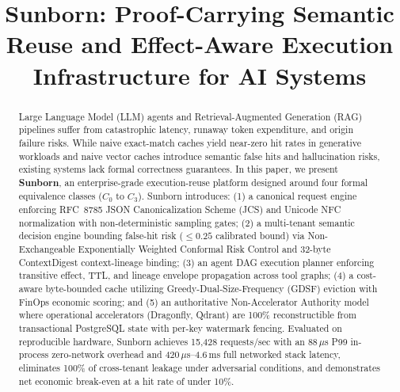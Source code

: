 \documentclass[conference]{IEEEtran}
\begin{document}
\title{Sunborn: Proof-Carrying Semantic Reuse and Effect-Aware Execution Infrastructure for AI Systems}

\author{
}

\maketitle

\begin{abstract}
Large Language Model (LLM) agents and Retrieval-Augmented Generation (RAG) pipelines suffer from catastrophic latency, runaway token expenditure, and origin failure risks. While naive exact-match caches yield near-zero hit rates in generative workloads and naive vector caches introduce semantic false hits and hallucination risks, existing systems lack formal correctness guarantees. In this paper, we present \textbf{Sunborn}, an enterprise-grade execution-reuse platform designed around four formal equivalence classes ($C_0$ to $C_3$). Sunborn introduces: (1) a canonical request engine enforcing RFC~8785 JSON Canonicalization Scheme (JCS) and Unicode NFC normalization with non-deterministic sampling gates; (2) a multi-tenant semantic decision engine bounding false-hit risk ($\le 0.25$ calibrated bound) via Non-Exchangeable Exponentially Weighted Conformal Risk Control and 32-byte ContextDigest context-lineage binding; (3) an agent DAG execution planner enforcing transitive effect, TTL, and lineage envelope propagation across tool graphs; (4) a cost-aware byte-bounded cache utilizing Greedy-Dual-Size-Frequency (GDSF) eviction with FinOps economic scoring; and (5) an authoritative Non-Accelerator Authority model where operational accelerators (Dragonfly, Qdrant) are 100\% reconstructible from transactional PostgreSQL state with per-key watermark fencing. Evaluated on reproducible hardware, Sunborn achieves 15,428 requests/sec with an 88\,$\mu$s P99 in-process zero-network overhead and 420\,$\mu$s--4.6\,ms full networked stack latency, eliminates 100\% of cross-tenant leakage under adversarial conditions, and demonstrates net economic break-even at a hit rate of under 10\%.
\end{abstract}
\end{document}
